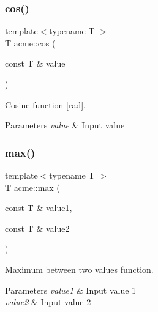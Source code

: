 \subsubsection{\texorpdfstring{cos()}{cos()}}
{\footnotesize\ttfamily template$<$typename T $>$ \\
T acme\+::cos (\begin{DoxyParamCaption}\item[{const T \&}]{value }\end{DoxyParamCaption})\hspace{0.3cm}{\ttfamily [inline]}}



Cosine function \mbox{[}rad\mbox{]}. 


\begin{DoxyParams}{Parameters}
{\em value} & Input value \\
\hline
\end{DoxyParams}
\mbox{\label{namespaceacme_abc0dd1e2a5441a08af324075636ea74a}} 
\subsubsection{\texorpdfstring{max()}{max()}\hspace{0.1cm}{\footnotesize\ttfamily [1/2]}}
{\footnotesize\ttfamily template$<$typename T $>$ \\
T acme\+::max (\begin{DoxyParamCaption}\item[{const T \&}]{value1,  }\item[{const T \&}]{value2 }\end{DoxyParamCaption})\hspace{0.3cm}{\ttfamily [inline]}}



Maximum between two values function. 


\begin{DoxyParams}{Parameters}
{\em value1} & Input value 1 \\
\hline
{\em value2} & Input value 2 \\
\hline
\end{DoxyParams}
\mbox{\label{namespaceacme_aca4726ee714290f5715f97242fd61cea}} 
